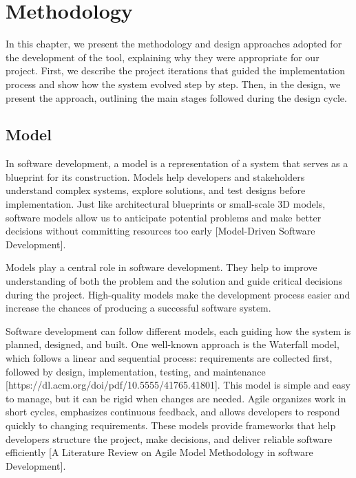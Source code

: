 %

\chapter{Methodology}
\label{chap:methodology}

In this chapter, we present the methodology and design approaches adopted for the development of the tool, explaining why they were appropriate for our project. First, we describe the project iterations that guided the implementation process and show how the system evolved step by step. Then, in the design, we present the approach, outlining the main stages followed during the design cycle.

\section{Model}
In software development, a model is a representation of a system that serves as a blueprint for its construction. Models help developers and stakeholders understand complex systems, explore solutions, and test designs before implementation. Just like architectural blueprints or small-scale 3D models, software models allow us to anticipate potential problems and make better decisions without committing resources too early [Model-Driven Software Development]. 

Models play a central role in software development. They help to improve understanding of both the problem and the solution and guide critical decisions during the project. High-quality models make the development process easier and increase the chances of producing a successful software system.

Software development can follow different models, each guiding how the system is planned, designed, and built. One well-known approach is the Waterfall model, which follows a linear and sequential process: requirements are collected first, followed by design, implementation, testing, and maintenance [https://dl.acm.org/doi/pdf/10.5555/41765.41801]. This model is simple and easy to manage, but it can be rigid when changes are needed. Agile organizes work in short cycles, emphasizes continuous feedback, and allows developers to respond quickly to changing requirements. These models provide frameworks that help developers structure the project, make decisions, and deliver reliable software efficiently [A Literature Review on Agile Model Methodology in software Development].

